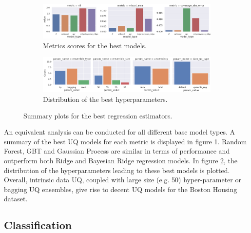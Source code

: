 \begin{figure}[!htbp]
    \centering
    \begin{subfigure}[b]{0.99\textwidth}
         \centering
         \includegraphics[width=\textwidth]{figures/eval/uqlearn/regression-best-models.png}
         \caption{Metrics scores for the best models.}
         \label{fig:regression-best-models-metrics}
     \end{subfigure}
     \hfill
     \begin{subfigure}[b]{0.99\textwidth}
         \centering
         \includegraphics[width=\linewidth]{figures/eval/uqlearn/regression_param_hist.png}
         \caption{Distribution of the best hyperparameters. }
         \label{fig:regression-hyperparam-hist}
     \end{subfigure}
     \caption{Summary plots for the best regression estimators.}
     \label{fig:regression-best-models}
\end{figure}


An equivalent analysis can be conducted for all different base model types. A summary of the best UQ models for each metric is displayed in figure \ref{fig:regression-best-models-metrics}. Random Forest, GBT and Gaussian Process are similar in terms of performance and outperform both Ridge and Bayesian Ridge regression models. In figure \ref{fig:regression-hyperparam-hist}, the distribution of the hyperparameters leading to these best models is plotted. Overall, intrinsic data UQ, coupled with large size (e.g. 50) hyper-parameter or bagging UQ ensembles, give rise to decent UQ models for the Boston Housing dataset. 


\subsection{Classification}


